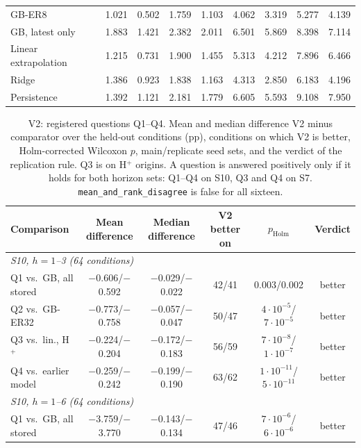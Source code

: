 \documentclass[conference]{IEEEtran}
\begin{document}
\begin{table}[t]
\begin{tabular}{lcccccccc}
    GB-ER8 & 1.021 & 0.502 & 1.759 & 1.103 & 4.062 & 3.319 & 5.277 & 4.139 \\
    GB, latest only & 1.883 & 1.421 & 2.382 & 2.011 & 6.501 & 5.869 & 8.398 & 7.114 \\
    Linear extrapolation & 1.215 & 0.731 & 1.900 & 1.455 & 5.313 & 4.212 & 7.896 & 6.466 \\
    Ridge & 1.386 & 0.923 & 1.838 & 1.163 & 4.313 & 2.850 & 6.183 & 4.196 \\
    Persistence & 1.392 & 1.121 & 2.181 & 1.779 & 6.605 & 5.593 & 9.108 & 7.950 \\
    \bottomrule
  \end{tabular}
\end{table}

\begin{table}[t]
  \centering
  \caption{V2: registered questions Q1--Q4. Mean and median difference V2 minus comparator over the held-out
    conditions (pp), conditions on which V2 is better, Holm-corrected Wilcoxon $p$, main/replicate seed sets, and the
    verdict of the replication rule. Q3 is on H$^+$ origins. A question is answered positively only if it holds for both
    horizon sets: Q1--Q4 on S10, Q3 and Q4 on S7. \texttt{mean\_and\_rank\_disagree} is false for all sixteen.}
  \label{tab:d38_primary}
  \setlength{\tabcolsep}{4pt}
  \scriptsize
  \begin{tabular}{lccccc}
    \toprule
    Comparison & Mean difference & Median difference & V2 better on & $p_{\mathrm{Holm}}$ & Verdict \\
    \midrule
    \multicolumn{6}{l}{\emph{S10, $h{=}1$--3 (64 conditions)}} \\
    Q1 vs.\ GB, all stored & $-$0.606/$-$0.592 & $-$0.029/$-$0.022 & 42/41 & 0.003/0.002 & better \\
    Q2 vs.\ GB-ER32 & $-$0.773/$-$0.758 & $-$0.057/$-$0.047 & 50/47 & $4\cdot10^{-5}$/$7\cdot10^{-5}$ & better \\
    Q3 vs.\ lin., H$^+$ & $-$0.224/$-$0.204 & $-$0.172/$-$0.183 & 56/59 & $7\cdot10^{-8}$/$1\cdot10^{-7}$ & better \\
    Q4 vs.\ earlier model & $-$0.259/$-$0.242 & $-$0.199/$-$0.190 & 63/62 & $1\cdot10^{-11}$/$5\cdot10^{-11}$ & better \\
    \multicolumn{6}{l}{\emph{S10, $h{=}1$--6 (64 conditions)}} \\
    Q1 vs.\ GB, all stored & $-$3.759/$-$3.770 & $-$0.143/$-$0.134 & 47/46 & $7\cdot10^{-6}$/$6\cdot10^{-6}$ & better \\

\end{tabular}
\end{table}
\end{document}
